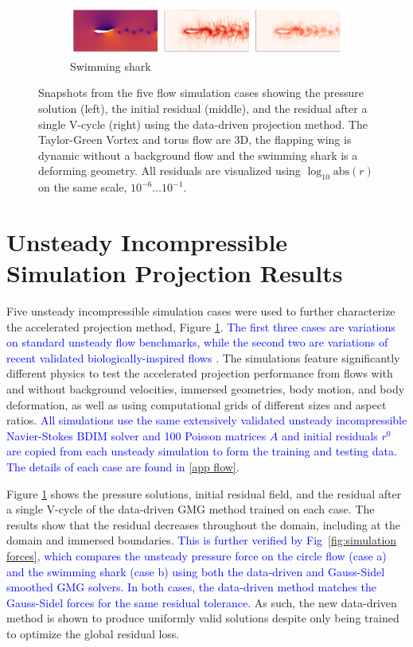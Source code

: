 \documentclass[review]{elsarticle}
\begin{document}
\begin{figure}
    \begin{subfigure}[b]{\textwidth}
        \centering
        \includegraphics[width=\textwidth]{figures/sharktriple.png}
        \caption{Swimming shark}
    \end{subfigure}
    \hfill
    \caption{Snapshots from the five flow simulation cases showing the pressure solution (left), the initial residual (middle), and the residual after a single V-cycle (right) using the data-driven projection method. The Taylor-Green Vortex and torus flow are 3D, the flapping wing is dynamic without a background flow and the swimming shark is a deforming geometry. All residuals are visualized using $\log_{10}\text{abs}(r)$ on the same scale, $10^{-6} \ldots 10^{-1}$.}
    \label{fig:simulation cases}
\end{figure}

\section{Unsteady Incompressible Simulation Projection Results}

Five unsteady incompressible simulation cases were used to further characterize the accelerated projection method, Figure \ref{fig:simulation cases}. \textcolor{blue}{The first three cases are variations on standard unsteady flow benchmarks, while the second two are variations of recent validated biologically-inspired flows \cite{Lauber2022}.} The simulations feature significantly different physics to test the accelerated projection performance from flows with and without background velocities, immersed geometries, body motion, and body deformation, as well as using computational grids of different sizes and aspect ratios. \textcolor{blue}{All simulations use the same extensively validated unsteady incompressible Navier-Stokes BDIM solver \cite{maertens2015accurate,Lauber2022} and 100 Poisson matrices $A$ and initial residuals $r^0$ are copied from each unsteady simulation to form the training and testing data. The details of each case are found in \ref{app flow}.}

Figure \ref{fig:simulation cases} shows the pressure solutions, initial residual field, and the residual after a single V-cycle of the data-driven GMG method trained on each case. The results show that the residual decreases throughout the domain, including at the domain and immersed boundaries. \textcolor{blue}{This is further verified by Fig~\ref{fig:simulation forces}, which compares the unsteady pressure force on the circle flow (case a) and the swimming shark (case b) using both the data-driven and Gauss-Sidel smoothed GMG solvers. In both cases, the data-driven method matches the Gauss-Sidel forces for the same residual tolerance.} As such, the new data-driven method is shown to produce uniformly valid solutions despite only being trained to optimize the global residual loss.
\end{document}
